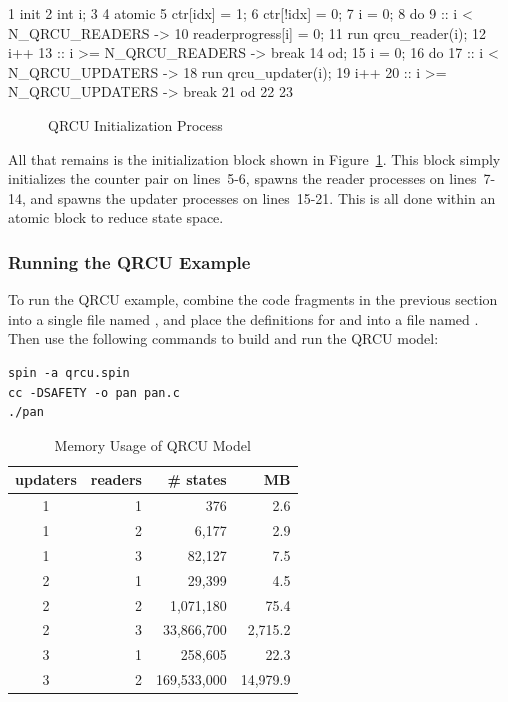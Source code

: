 { \scriptsize
\begin{verbbox}
  1 init {
  2   int i;
  3
  4   atomic {
  5     ctr[idx] = 1;
  6     ctr[!idx] = 0;
  7     i = 0;
  8     do
  9     :: i < N_QRCU_READERS ->
 10       readerprogress[i] = 0;
 11       run qrcu_reader(i);
 12       i++
 13     :: i >= N_QRCU_READERS -> break
 14     od;
 15     i = 0;
 16     do
 17     :: i < N_QRCU_UPDATERS ->
 18       run qrcu_updater(i);
 19       i++
 20     :: i >= N_QRCU_UPDATERS -> break
 21     od
 22   }
 23 }
\end{verbbox}
}
\begin{figure}[htbp]
\centering
\theverbbox
\caption{QRCU Initialization Process}
\label{fig:analysis:QRCU Initialization Process}
\end{figure}

All that remains is the initialization block shown in
Figure~\ref{fig:analysis:QRCU Initialization Process}.
This block simply initializes the counter pair on lines~5-6,
spawns the reader processes on lines~7-14, and spawns the updater
processes on lines~15-21.
This is all done within an atomic block to reduce state space.

\subsubsection{Running the QRCU Example}
\label{sec:formal:Running the QRCU Example}

To run the QRCU example, combine the code fragments in the previous
section into a single file named , and place the definitions
for  and  into a file named
.
Then use the following commands to build and run the QRCU model:

\vspace{5pt}
\begin{minipage}[t]{\columnwidth}
\scriptsize
\begin{verbatim}
spin -a qrcu.spin
cc -DSAFETY -o pan pan.c
./pan
\end{verbatim}
\end{minipage}
\vspace{5pt}

\begin{table}
\footnotesize
\centering
\begin{tabular}{c|r|r|r}
	updaters &
	    readers &
		   \# states & MB \\
	\hline
	1 & 1 &         376 &      2.6 \\
	\hline
	1 & 2 &       6,177 &      2.9 \\
	\hline
	1 & 3 &      82,127 &      7.5 \\
	\hline
	2 & 1 &      29,399 &      4.5 \\
	\hline
	2 & 2 &   1,071,180 &     75.4 \\
	\hline
	2 & 3 &  33,866,700 &  2,715.2 \\
	\hline
	3 & 1 &     258,605 &     22.3 \\
	\hline
	3 & 2 & 169,533,000 & 14,979.9 \\
\end{tabular}
\caption{Memory Usage of QRCU Model}
\label{tab:advsync:Memory Usage of QRCU Model}
\end{table}

